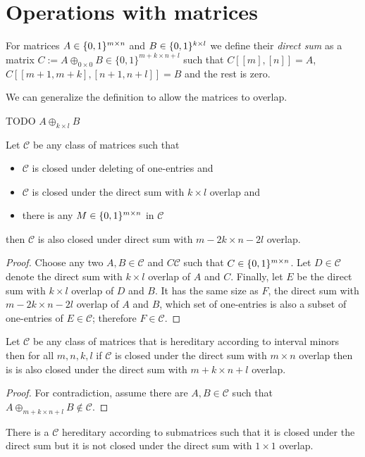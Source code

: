 \section{Operations with matrices}
\begin{defn}
For matrices $A\in\{0,1\}^{m\times n}$ and $B\in\{0,1\}^{k\times l}$ we define their \emph{direct sum} as a matrix $C:=A\oplus_{0\times0}B\in\{0,1\}^{m+k\times n+l}$ such that $C[[m],[n]]=A$, $C[[m+1,m+k],[n+1,n+l]]=B$ and the rest is zero.
\end{defn}
We can generalize the definition to allow the matrices to overlap.
\begin{defn}
TODO $A\oplus_{k\times l}B$
\end{defn}
\begin{thm}
Let $\mathcal{C}$ be any class of matrices such that
\begin{itemize}
\item $\mathcal{C}$ is closed under deleting of one-entries and
\item $\mathcal{C}$ is closed under the direct sum with $k\times l$ overlap and
\item there is any $M\in\{0,1\}^{m\times n}$ in $\mathcal{C}$
\end{itemize}
then $\mathcal{C}$ is also closed under direct sum with $m-2k\times n-2l$ overlap.
\end{thm}
\begin{proof}
Choose any two $A,B\in\mathcal{C}$ and $C\mathcal{C}$ such that $C\in\{0,1\}^{m\times n}$. Let $D\in\mathcal{C}$ denote the direct sum with $k\times l$ overlap of $A$ and $C$. Finally, let $E$ be the direct sum with $k\times l$ overlap of $D$ and $B$. It has the same size as $F$, the direct sum with $m-2k\times n-2l$ overlap of $A$ and $B$, which set of one-entries is also a subset of one-entries of $E\in\mathcal{C}$; therefore $F\in\mathcal{C}$.
\end{proof}
\begin{thm}
\label{hered}
Let $\mathcal{C}$ be any class of matrices that is hereditary according to interval minors then for all $m,n,k,l$ if $\mathcal{C}$ is closed under the direct sum with $m\times n$ overlap then is is also closed under the direct sum with $m+k\times n+l$ overlap.
\end{thm}
\begin{proof}
For contradiction, assume there are $A,B\in\mathcal{C}$ such that $A\oplus_{m+k\times n+l}B\not\in\mathcal{C}$.
\end{proof}
\begin{obs}
There is a $\mathcal{C}$ hereditary according to submatrices such that it is closed under the direct sum but it is not closed under the direct sum with $1\times1$ overlap.
\end{obs}

